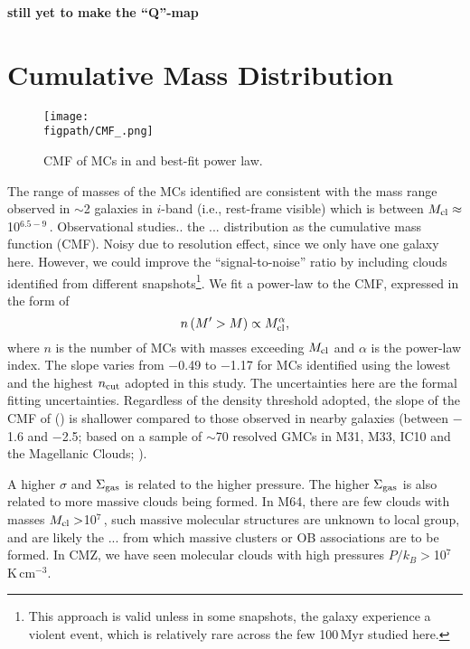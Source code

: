 \documentclass[iop]{emulateapj} %
\begin{document}
{\bf still yet to make the ``Q''-map}






\section{Cumulative Mass Distribution}   \label{sec:cmf}

\begin{figure*}[htbp]
\centering
\texttt{[image: \\figpath/CMF\_.png]}
\caption{
CMF of MCs in \flower and best-fit power law.
\label{fig:cmf}}
\end{figure*}

The range of masses of the MCs identified are consistent with the mass range observed in \z$\sim$2 galaxies in $i$-band 
(i.e., rest-frame visible) which is between $M_{\rm cl}\approx$10$^{6.5-9}$\,\Msun \citep{Elmegreen07a, Elmegreen09a}.
Observational studies.. the ... distribution as the cumulative mass function (CMF).
Noisy due to resolution effect, since we only have one galaxy here. However,
we could improve the ``signal-to-noise'' ratio by including clouds identified from different
snapshots\footnote{This approach is valid unless in some snapshots,
the galaxy experience a violent event, which is relatively rare across the few 100\,Myr studied here.}.
We fit a power-law to the CMF, expressed in the form of 
\begin{equation}
n\left(M^\prime > M\right) \propto M_{\rm cl}^\alpha,
\end{equation}
where $n$ is the number of MCs with masses exceeding $M_{\rm cl}$ and $\alpha$ is the power-law index.
The slope varies from $-$0.49 to $-$1.17 for MCs identified using the lowest and the
highest $n_{\rm cut}$ adopted in this study.
The uncertainties here are the formal fitting uncertainties.
Regardless of the density threshold adopted, the slope of the CMF of \flower ()
is shallower compared to those observed in nearby galaxies (between $-$1.6 and $-$2.5; based on a sample of
$\sim$70 resolved GMCs in M31, M33, IC10 and the Magellanic Clouds; \citealt{Blitz07a}). %

A higher $\sigma$ and $\Sigma_{\rm gas}$ is related to the higher
pressure. The higher $\Sigma_{\rm gas}$ is also related to more massive clouds being formed.
In M64, there are few clouds with masses $M_{\rm cl}>$10$^7$\,\Msun, such massive molecular
structures are unknown to local group, and are likely the ... from which massive clusters or OB associations are to be formed.
In CMZ, we have seen molecular clouds with high pressures $P/k_B > $10$^7$\,K\,cm$^{-3}$. %
\end{document}
